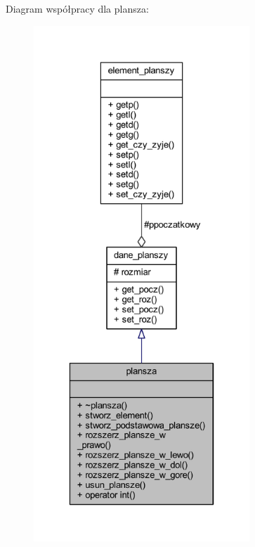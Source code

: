 Diagram współpracy dla plansza\+:
\nopagebreak
\begin{figure}[H]
\begin{center}
\leavevmode
\includegraphics[height=550pt]{classplansza__coll__graph}
\end{center}
\end{figure}
